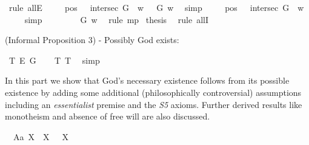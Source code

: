 \begin{isabellebody}
\ {\isacharparenleft}rule\ allE{\isacharparenright}\isanewline
\ \ \isamarkupfalse%
\ {}{\isacharcolon}\ {\isachardoublequoteopen}{\isacharparenleft}{\isacharparenleft}pos\ {\isasymP}\ \isactrlbold {\isasymand}\ intersec\ G\ {\isasymP}{\isacharparenright}\ w{\isacharparenright}\ {\isasymlongrightarrow}\ {\isasymP}\ G\ w{\isachardoublequoteclose}\ \isamarkupfalse%
\ simp\isanewline
\ \ \isamarkupfalse%
\ {}{\isacharcolon}\ {\isachardoublequoteopen}{\isacharparenleft}{\isacharparenleft}pos\ {\isasymP}{\isacharparenright}\ \isactrlbold {\isasymand}\ {\isacharparenleft}intersec\ G\ {\isasymP}{\isacharparenright}{\isacharparenright}\ w{\isachardoublequoteclose}\ \isamarkupfalse%
\ {}\ {}\ \isamarkupfalse%
\ simp\isanewline
\ \ \isamarkupfalse%
\ {}\ {}\ \isamarkupfalse%
\ {\isachardoublequoteopen}{\isasymP}\ G\ w{\isachardoublequoteclose}\ \isamarkupfalse%
\ {\isacharparenleft}rule\ mp{\isacharparenright}\isanewline
\isacommand{{\isacharbraceright}}\isamarkupfalse%
\isanewline
{}\isamarkupfalse%
\ {\isacharquery}thesis\ \isamarkupfalse%
\ {\isacharparenleft}rule\ allI{\isacharparenright}\isanewline
{}\isamarkupfalse%
%
%
%
%
\begin{isamarkuptext}%
(Informal Proposition 3) - Possibly God exists:%
\end{isamarkuptext}\isamarkuptrue%
\isamarkupfalse%
\ T{}{\isacharcolon}\ {\isachardoublequoteopen}{\isasymlfloor}\isactrlbold {\isasymdiamond}\isactrlbold {\isasymexists}\isactrlsup E\ G{\isasymrfloor}{\isachardoublequoteclose}%
\ \ %
%
\isamarkupfalse%
\ T{}\ T{}\ \isamarkupfalse%
\ simp%
%
%
%
\isamarkuptrue%
%
\begin{isamarkuptext}%
In this part we show that God's necessary existence follows from its possible existence by adding some
 additional (philosophically controversial) assumptions including an \emph{essentialist} premise 
 and the \emph{S5} axioms. Further derived results like monotheism and absence of free will are also discussed.%
\end{isamarkuptext}\isamarkuptrue%
\isamarkupfalse%
\ \ A{}a{\isacharcolon}\ {\isachardoublequoteopen}{\isasymlfloor}\isactrlbold {\isasymforall}X{\isachardot}\ {\isasymP}\ X\ \isactrlbold {\isasymrightarrow}\ \isactrlbold {\isasymbox}{\isacharparenleft}{\isasymP}\ X{\isacharparenright}{\isasymrfloor}{\isachardoublequoteclose}%

\end{isabellebody}
